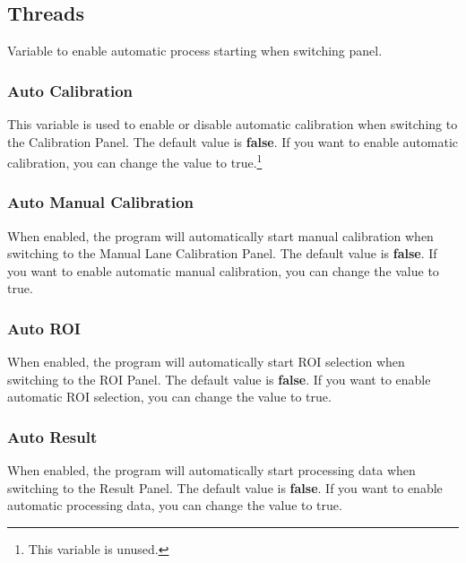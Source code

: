 \subsection{Threads}

Variable to enable automatic process starting when switching panel.

\subsubsection{Auto Calibration}
This variable is used to enable or disable automatic calibration when switching to the Calibration Panel. The default value is \textbf{false}. If you want to enable automatic calibration, you can change the value to true.\footnote{This variable is unused.}

\subsubsection{Auto Manual Calibration}
When enabled, the program will automatically start manual calibration when switching to the Manual Lane Calibration Panel. The default value is \textbf{false}. If you want to enable automatic manual calibration, you can change the value to true.

\subsubsection{Auto ROI}
When enabled, the program will automatically start ROI selection when switching to the ROI Panel. The default value is \textbf{false}. If you want to enable automatic ROI selection, you can change the value to true.

\subsubsection{Auto Result}
When enabled, the program will automatically start processing data when switching to the Result Panel. The default value is \textbf{false}. If you want to enable automatic processing data, you can change the value to true.
